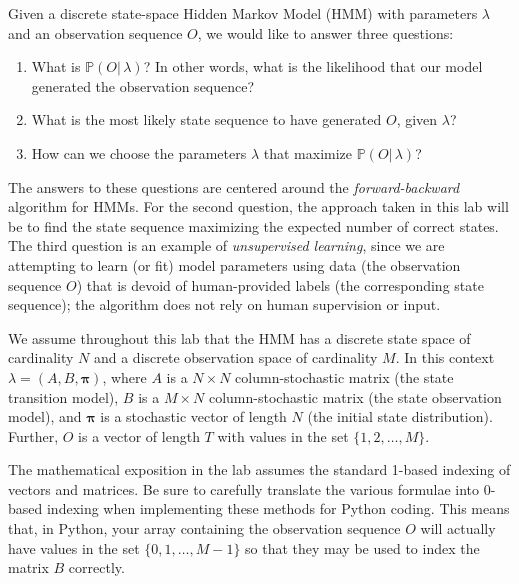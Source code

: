 \label{lab:hmm}

Given a discrete state-space Hidden Markov Model (HMM) with parameters $\lambda$ and an observation sequence $O$, we would like to answer three questions:
\begin{enumerate}
 \item What is $\mathbb{P}(O |\, \lambda)$? In other words, what is the likelihood that our model generated the observation sequence?
 \item What is the most likely state sequence to have generated $O$, given $\lambda$?
 \item How can we choose the parameters $\lambda$ that maximize $\mathbb{P}(O | \, \lambda)$?
\end{enumerate}
The answers to these questions are centered around the \emph{forward-backward} algorithm for HMMs.
For the second question, the approach taken in this lab will be to find the state sequence maximizing the expected number of correct states.
The third question is an example of \emph{unsupervised learning}, since we are attempting to learn (or fit) model parameters using data (the observation sequence $O$) that is devoid
of human-provided labels (the corresponding state sequence); the algorithm does not rely on human supervision or input.

We assume throughout this lab that the HMM has a discrete state space of cardinality $N$ and a discrete observation space of cardinality $M$.
In this context $\lambda = \left( A, B, \mathbf{\pi} \right)$, where $A$ is a $N \times N$  column-stochastic matrix (the state transition model), $B$ is a $M \times N$ column-stochastic matrix (the
state observation model), and $\mathbf{\pi}$ is a stochastic vector of length $N$ (the initial state distribution).
Further, $O$ is a vector of length $T$ with values in the set $\{1,2,\ldots,M\}$.

\begin{warn}
The mathematical exposition in the lab assumes the standard 1-based indexing of vectors and matrices.
Be sure to carefully translate the various formulae into 0-based indexing when implementing these methods for Python coding.
This means that, in Python, your array containing the observation sequence $O$ will actually have values
in the set $\{0,1,\ldots,M-1\}$ so that they may be used to index the matrix $B$ correctly.
\end{warn}

